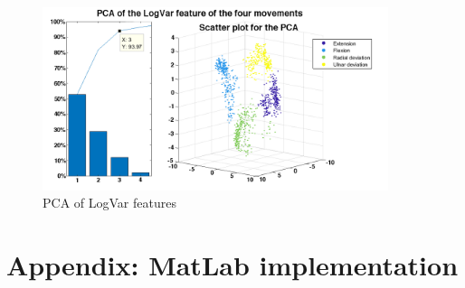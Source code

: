 \begin{figure}[H] 
	\includegraphics[width=0.9\textwidth]{figures/zASP/pcasubplotLogVar}
	\caption{PCA of LogVar features}
	\label{PCALogVar}
\end{figure}



\section*{Appendix: MatLab implementation}



